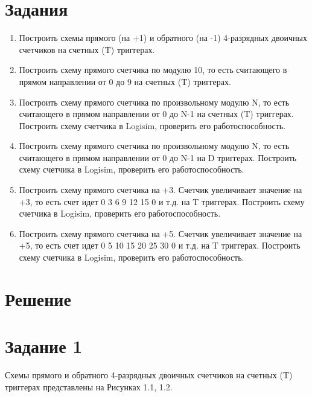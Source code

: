 \documentclass[oneside,a4paper,14pt]{extarticle}
\begin{document}
\section*{Задания}
\begin{enumerate}
	\item
	      Построить схемы прямого (на +1) и обратного (на -1) 4-разрядных
	      двоичных счетчиков на счетных (T) триггерах.
	\item
	      Построить схему прямого счетчика по модулю 10, то есть считающего
	      в прямом направлении от 0 до 9 на счетных (T) триггерах.
	\item
	      Построить схему прямого счетчика по произвольному модулю N, то
	      есть считающего в прямом направлении от 0 до N-1 на счетных (T) триггерах.
	      Построить схему счетчика в Logisim, проверить его работоспособность.
	\item
	      Построить схему прямого счетчика по произвольному модулю N, то
	      есть считающего в прямом направлении от 0 до N-1 на D триггерах.
	      Построить схему счетчика в Logisim, проверить его работоспособность.
	\item 
		  Построить схему прямого счетчика на +3. Счетчик увеличивает значение на
		  +3, то есть счет идет 0 3 6 9 12 15 0 и т.д. на T триггерах. Построить схему
		  счетчика в Logisim, проверить его работоспособность.
	\item 
		  Построить схему прямого счетчика на +5. Счетчик увеличивает значение на
		  +5, то есть счет идет 0 5 10 15 20 25 30 0 и т.д. на T триггерах. Построить
		  схему счетчика в Logisim, проверить его работоспособность.
\end{enumerate}
\newpage

\section*{Решение}

\section*{Задание 1}
\noindent Схемы прямого и обратного 4-разрядных двоичных счетчиков на счетных (T) триггерах представлены на Рисунках 1.1, 1.2.\\
\end{document}
